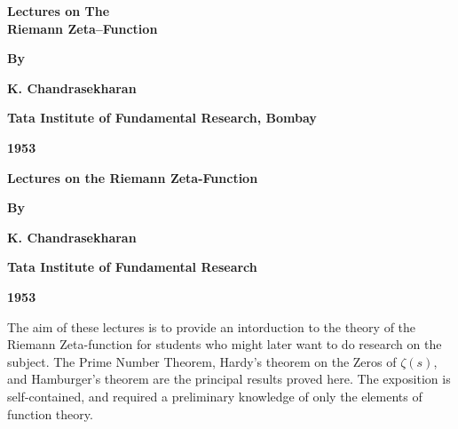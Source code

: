 \thispagestyle{empty}

\begin{center}
{\Large\bf Lectures on The}\\[5pt]
{\Large\bf Riemann Zeta--Function}\\
\vskip 1cm

{\bf By}
\medskip

{\large\bf K. Chandrasekharan}
\vfill

{\bf Tata Institute of Fundamental Research, Bombay}
\medskip

{\bf 1953}
\end{center}

\eject

\thispagestyle{empty}
\begin{center}
{\Large\bf Lectures on the Riemann Zeta-Function}
\vskip 1cm

{\bf By}
\medskip

{\large\bf K. Chandrasekharan}
\vfill

{\bf Tata Institute of Fundamental Research}
\medskip

{\bf 1953}
\end{center}
\eject

\thispagestyle{empty}


{\narrower\narrower
The aim of these lectures is to provide an 
intorduction to the theory of the Riemann
Zeta-function for students who might later
want to do research on the subject. The 
Prime  Number Theorem, Hardy's theorem on the
Zeros of $\zeta(s)$, and Hamburger's theorem are 
the principal results proved here. The 
exposition is self-contained, and required
a preliminary knowledge of only the elements
of function theory.\par}


